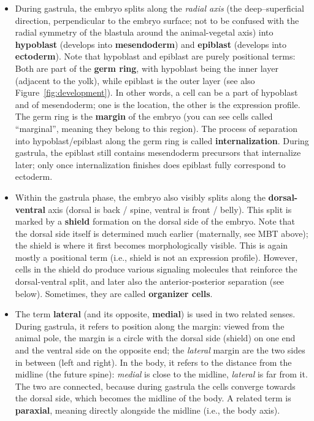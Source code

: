 \documentclass[11pt,a4paper]{article}
\begin{document}
\begin{itemize}
\begin{itemize}
		\item During gastrula, the embryo splits along the \emph{radial axis} (the deep--superficial direction, perpendicular to the embryo surface; not to be confused with the radial symmetry of the blastula around the animal-vegetal axis) into \textbf{hypoblast} (develops into \textbf{mesendoderm}) and \textbf{epiblast} (develops into \textbf{ectoderm}). Note that hypoblast and epiblast are purely positional terms: Both are part of the \textbf{germ ring}, with hypoblast being the inner layer (adjacent to the yolk), while epiblast is the outer layer (see also Figure~\ref{fig:development}). In other words, a cell can be a part of hypoblast and of mesendoderm; one is the location, the other is the expression profile. The germ ring is the \textbf{margin} of the embryo (you can see cells called ``marginal'', meaning they belong to this region). The process of separation into hypoblast/epiblast along the germ ring is called \textbf{internalization}. During gastrula, the epiblast still contains mesendoderm precursors that internalize later; only once internalization finishes does epiblast fully correspond to ectoderm. 
		\item Within the gastrula phase, the embryo also visibly splits along the \textbf{dorsal-ventral} axis (dorsal is back / spine, ventral is front / belly). This split is marked by a \textbf{shield} formation on the dorsal side of the embryo. Note that the dorsal side itself is determined much earlier (maternally, see MBT above); the shield is where it first becomes morphologically visible. This is again mostly a positional term (i.e., shield is not an expression profile). However, cells in the shield do produce various signaling molecules that reinforce the dorsal-ventral split, and later also the anterior-posterior separation (see below). Sometimes, they are called \textbf{organizer cells}.
		\item The term \textbf{lateral} (and its opposite, \textbf{medial}) is used in two related senses. During gastrula, it refers to position along the margin: viewed from the animal pole, the margin is a circle with the dorsal side (shield) on one end and the ventral side on the opposite end; the \emph{lateral} margin are the two sides in between (left and right). In the body, it refers to the distance from the midline (the future spine): \emph{medial} is close to the midline, \emph{lateral} is far from it. The two are connected, because during gastrula the cells converge towards the dorsal side, which becomes the midline of the body. A related term is \textbf{paraxial}, meaning directly alongside the midline (i.e., the body axis).

\end{itemize}
\end{itemize}
\end{document}
